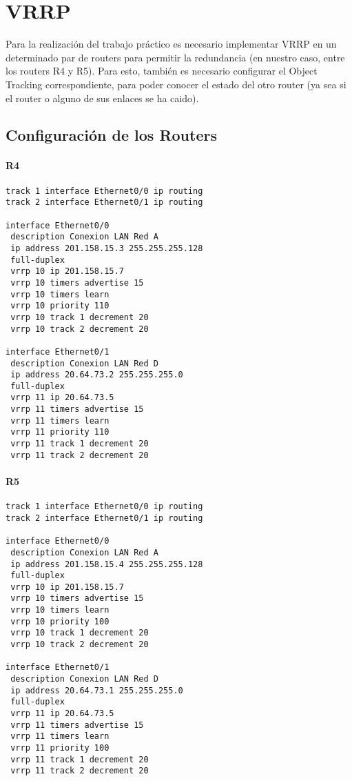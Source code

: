 \section{VRRP}
Para la realización del trabajo práctico es necesario implementar VRRP en un determinado par de routers para permitir la redundancia (en nuestro caso, entre los routers R4 y R5). Para esto, también es necesario configurar el Object Tracking correspondiente, para poder conocer el estado del otro router (ya sea si el router o alguno de sus enlaces se ha caido).
\subsection{Configuración de los Routers}
\paragraph{R4}
{\small
\begin{verbatim}
track 1 interface Ethernet0/0 ip routing
track 2 interface Ethernet0/1 ip routing

interface Ethernet0/0
 description Conexion LAN Red A
 ip address 201.158.15.3 255.255.255.128
 full-duplex
 vrrp 10 ip 201.158.15.7
 vrrp 10 timers advertise 15
 vrrp 10 timers learn
 vrrp 10 priority 110
 vrrp 10 track 1 decrement 20
 vrrp 10 track 2 decrement 20

interface Ethernet0/1
 description Conexion LAN Red D
 ip address 20.64.73.2 255.255.255.0
 full-duplex
 vrrp 11 ip 20.64.73.5
 vrrp 11 timers advertise 15
 vrrp 11 timers learn
 vrrp 11 priority 110
 vrrp 11 track 1 decrement 20
 vrrp 11 track 2 decrement 20
\end{verbatim}
}

\paragraph{R5}
{\small
\begin{verbatim}
track 1 interface Ethernet0/0 ip routing
track 2 interface Ethernet0/1 ip routing

interface Ethernet0/0
 description Conexion LAN Red A
 ip address 201.158.15.4 255.255.255.128
 full-duplex
 vrrp 10 ip 201.158.15.7
 vrrp 10 timers advertise 15
 vrrp 10 timers learn
 vrrp 10 priority 100
 vrrp 10 track 1 decrement 20
 vrrp 10 track 2 decrement 20

interface Ethernet0/1
 description Conexion LAN Red D
 ip address 20.64.73.1 255.255.255.0
 full-duplex
 vrrp 11 ip 20.64.73.5
 vrrp 11 timers advertise 15
 vrrp 11 timers learn
 vrrp 11 priority 100
 vrrp 11 track 1 decrement 20
 vrrp 11 track 2 decrement 20
\end{verbatim}
}

